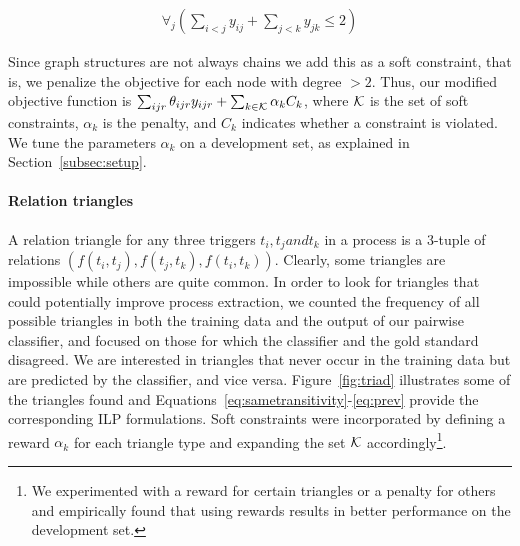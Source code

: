 \begin{align}
\forall_j (\sum_{i<j} y_{ij} + \sum_{j<k} y_{jk} \leq 2)
\end{align}

Since graph structures are not always chains we add this as a soft constraint, that is, we penalize the objective for each node with degree $>2$. Thus, our modified objective function is $\sum_{ijr} \theta_{ijr} y_{ijr} + \sum_{k \in \mathcal{K}} \alpha_k C_k$, where $\mathcal{K}$ is the set of soft constraints, $\alpha_k$ is the penalty, and $C_k$ indicates whether a constraint is violated. We tune the parameters $\alpha_k$ on a development set, as explained in Section~\ref{subsec:setup}.

\paragraph{Relation triangles} 
A relation triangle for any three triggers $t_{i}, t_{j} and t_{k}$ in a process is a 3-tuple of relations $(f(t_i, t_j),f(t_j, t_k),f(t_i, t_k))$. Clearly, some triangles are impossible while others are quite common. In order to look for triangles that could potentially improve process extraction, we counted the frequency of all possible triangles in both the training data and the output of our pairwise classifier, and focused on those for which the classifier and the gold standard disagreed. We are interested in triangles that never occur in the training data but are predicted by the classifier, and vice versa. Figure~\ref{fig:triad} illustrates some of the triangles found and Equations~\ref{eq:sametransitivity}-\ref{eq:prev} provide the corresponding ILP formulations. Soft constraints were incorporated by defining a reward $\alpha_k$ for each triangle type and expanding the set $\mathcal{K}$ accordingly\footnote{We experimented with a reward for certain triangles or a penalty for others and empirically found that using rewards results in better performance on the development set.}. 

